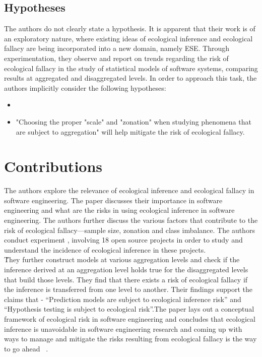 \documentclass{acm_proc_article-sp}
\begin{document}
\subsection{Hypotheses}
\label{thesis-hypo}
The authors do not clearly state a hypothesis.  It is apparent that their work is of an exploratory nature, where existing ideas of ecological inference and ecological fallacy are being incorporated into a new domain, namely ESE.  Through experimentation, they observe and report on trends regarding the risk of ecological fallacy in the study of statistical models of software systems, comparing results at aggregated and disaggregated levels.  In order to approach this task, the authors implicitly consider the following hypotheses:
\begin{itemize}
	\item 
	\item "Choosing the proper "scale" and "zonation" when studying phenomena that are subject to aggregation" will help mitigate the risk of ecological fallacy.
\end{itemize}

\section{Contributions}
\label{contrib}

The authors explore the relevance of ecological inference and ecological fallacy in software engineering. The paper discusses their importance in software engineering and 
what are the risks in using ecological inference in software engineering. The authors further discuss the various factors that contribute to the risk of ecological fallacy---sample size,
zonation and class imbalance. The authors conduct experiment , involving 18 open source projects in order to study and understand the incidence of ecological inference in these projects. \\
\~They further construct models at various aggregation levels and check if the inference derived at an aggregation level holds true for the disaggregated levels that build those levels. They find that there exists a risk of ecological fallacy if the inference is transferred from one level to another. Their findings support the claims that - ``Prediction models are subject to ecological inference risk'' and ``Hypothesis testing is subject to ecological risk''.The paper lays out a conceptual framework of ecological risk in software engineering and concludes that ecological inference is unavoidable in software engineering research and coming up with ways to manage and mitigate the risks resulting from ecological fallacy is the way to go ahead ~\cite{posnett:2011}.
\end{document}

